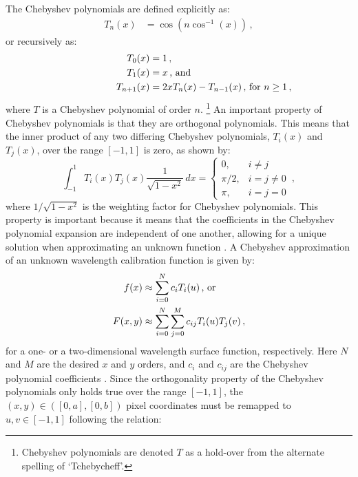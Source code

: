 The Chebyshev polynomials are defined explicitly as:
\begin{align} \label{eq:chebypolyexplicit}
    T_{n}(x) &= \cos(n \cos^{-1}(x))\,,
\end{align}
or recursively as:
\begin{align}
    T_{0}(x) &= 1 \,,\notag\\
    T_{1}(x) &= x \rlap{\,,\ and} \label{eq:chebypoly}\\
    T_{n+1}(x) &= 2xT_n(x) - T_{n-1}(x) \rlap{\,,\ for $n \geq 1$\,,}\notag
\end{align}
where $T$ is a Chebyshev polynomial of order $n$.%
\footnote{Chebyshev polynomials are denoted $T$ as a hold-over from the alternate spelling of `Tchebycheff'.}
An important property of Chebyshev polynomials is that they are orthogonal polynomials.
This means that the inner product of any two differing Chebyshev polynomials, $T_{i}(x)$ and $T_{j}(x)$, over the range $[-1, 1]$ is zero, as shown by:
\begin{equation} \label{eq:chebyorth}
    \int_{-1}^{1} T_{i}(x) T_{j}(x) \frac{1}{\sqrt{1-x^{2}}} \,dx =
    \begin{cases}
        0,       & i \neq j     \\
        \pi / 2, & i = j \neq 0 \\
        \pi,     & i = j = 0
    \end{cases}\,,
\end{equation}
where $1 / \sqrt{1 - x^{2}}$ is the weighting factor for Chebyshev polynomials.
This property is important because it means that the coefficients in the Chebyshev polynomial expansion are independent of one another, allowing for a unique solution when approximating an unknown function \citep{numerical_recipes, cheby}.
A Chebyshev approximation of an unknown wavelength calibration function is given by:
\begin{align} \label{eq:chebyshev}
    f(x) &\approx \sum_{i = 0}^{N}  c_{i} T_{i}(u)\rlap{\,,\ or}\\
    F(x, y) &\approx \sum_{i = 0}^{N} \sum_{j = 0}^{M} c_{ij} T_{i}(u) T_{j}(v)\,,\label{eq:chebyshev2D}
\end{align}
for a one- or a two-dimensional wavelength surface function, respectively.
Here $N$ and $M$ are the desired $x$ and $y$ orders, and $c_{i}$ and $c_{ij}$ are the Chebyshev polynomial coefficients \citep{chebysurf, cheby2d}.
Since the orthogonality property of the Chebyshev polynomials only holds true over the range $[-1, 1]$, the $(x, y) \in ([0, a], [0, b])$ pixel coordinates must be remapped to $u, v \in [-1, 1]$ following the relation:
